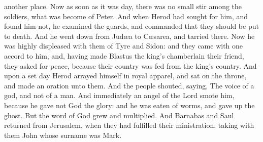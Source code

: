 another place. Now as soon as it was day, there was no small stir among the soldiers, what was become of Peter. And when Herod had sought for him, and found him not, he examined the guards, and commanded that they should be put to death. And he went down from Judæa to Cæsarea, and tarried there.  Now he was highly displeased with them of Tyre and Sidon: and they came with one accord to him, and, having made Blastus the king’s chamberlain their friend, they asked for peace, because their country was fed from the king’s country. And upon a set day Herod arrayed himself in royal apparel, and sat on the throne, and made an oration unto them. And the people shouted, saying, The voice of a god, and not of a man. And immediately an angel of the Lord smote him, because he gave not God the glory: and he was eaten of worms, and gave up the ghost.  But the word of God grew and multiplied.  And Barnabas and Saul returned from Jerusalem, when they had fulfilled their ministration, taking with them John whose surname was Mark. 

